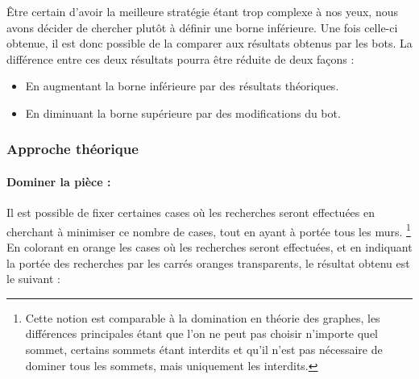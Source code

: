 \documentclass[a4paper,12pt]{article}
\begin{document}
Être certain d'avoir la meilleure stratégie étant trop complexe à nos yeux, nous
avons décider de chercher plutôt à définir une borne inférieure. Une fois
celle-ci obtenue, il est donc possible de la comparer aux résultats obtenus par
les bots. La différence entre ces deux résultats pourra être réduite de deux
façons :
\begin{itemize}
\item En augmentant la borne inférieure par des résultats théoriques.
\item En diminuant la borne supérieure par des modifications du bot.
\end{itemize}

\subsubsection{Approche théorique}

\paragraph{Dominer la pièce :}
Il est possible de fixer certaines cases où les recherches seront effectuées en
cherchant à minimiser ce nombre de cases, tout en ayant à portée tous les murs.
\footnote{Cette notion est comparable à la domination en théorie des graphes,
  les différences principales étant que l'on ne peut pas choisir n'importe quel
  sommet, certains sommets étant interdits et qu'il n'est pas nécessaire de
  dominer tous les sommets, mais uniquement les interdits.}
\\
En colorant en orange les cases où les recherches seront effectuées, et en
indiquant la portée des recherches par les carrés oranges transparents, le
résultat obtenu est le suivant :
\end{document}
